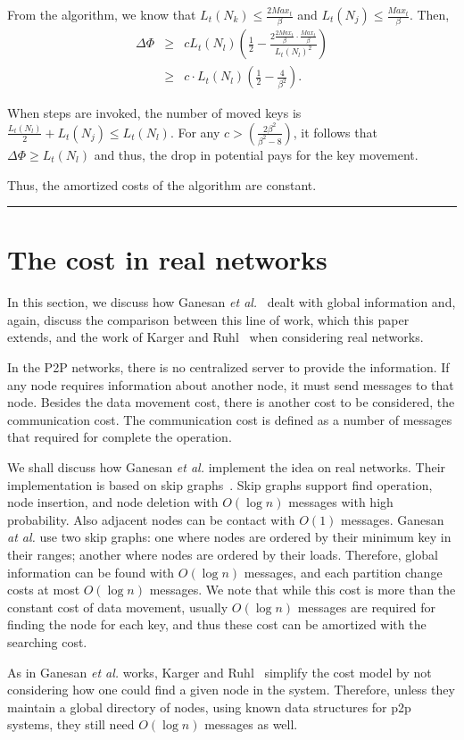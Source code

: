 \documentclass[a4paper]{article}
\newenvironment{proof}{{\bf Proof:}}{\hfill\rule{1.5mm}{3mm}\vspace{0.1in}}
\begin{document}
\begin{proof}
From the algorithm, we know that $L_t(N_k)\leq \frac{2Max_t}{\beta}$
and $L_t(N_j)\leq \frac{Max_t}{\beta}$. Then,
\begin{eqnarray*}  			
  \Delta\Phi&\geq& c L_t(N_l)\left(\frac{1}{2}-\frac{2\frac{2
        Max_t}{\beta} \cdot\frac{ Max_t}{\beta}}{L_t(N_l)^2}\right)\\
  &\geq& c\cdot L_t(N_l)\left(\frac{1}{2}-\frac{4}{\beta^2
    }\right).
\end{eqnarray*}

When {\splitmax} steps are invoked, the number of moved keys is
$\frac{L_t(N_l)}{2}+L_t(N_j)\leq L_t(N_l)$. For any
$c>\left(\frac{2\beta^2}{\beta^2-8}\right)$, it follows that $\Delta\Phi\geq
L_t(N_l)$ and thus, the drop in potential pays for the key movement.

Thus, the amortized costs of the algorithm are constant.
\end{proof}

\section{The cost in real networks}
\label{sect:p2p}

In this section, we discuss how Ganesan {\em et
  al.}~\cite{GanesanBGM04-vldb} dealt with  global information and,
again, discuss the comparison between this line of work, which this
paper extends, and the work of Karger and
Ruhl~\cite{Karger03newalgorithms, Karger04simpleefficient} when
considering real networks.

In the P2P networks, there is no centralized server to
provide the information.  If any node requires information about another
node, it must send  messages to that node.  Besides the data
movement cost, there is another cost to be considered, the
communication cost.  The communication cost is defined as a number
of messages that required for complete the operation.

We shall discuss how Ganesan {\em et al.} implement the idea on real
networks.  Their implementation is based on skip
graphs~\cite{Aspnes-SODA03}.  Skip graphs support find operation,
node insertion, and node deletion with $O(\log n)$ messages with high
probability.  Also adjacent nodes can be contact with $O(1)$ messages.
Ganesan {\em at al.}  use two skip graphs: one where nodes are
ordered by their minimum key in their ranges; another where nodes are
ordered by their loads.  Therefore, global information can be found
with $O(\log n)$ messages, and each partition change costs at most
$O(\log n)$ messages.  We note that while this cost is more than the
constant cost of data movement, usually $O(\log n)$ messages are
required for finding the node for each key, and thus these cost can be
amortized with the searching cost.

As in Ganesan {\em et al.} works, Karger and
Ruhl~\cite{Karger03newalgorithms, Karger04simpleefficient} simplify
the cost model by not considering how one could find a given node in
the system.  Therefore, unless they maintain a global directory of
nodes, using known data structures for p2p systems, they still need
$O(\log n)$ messages as well.


\end{document}
